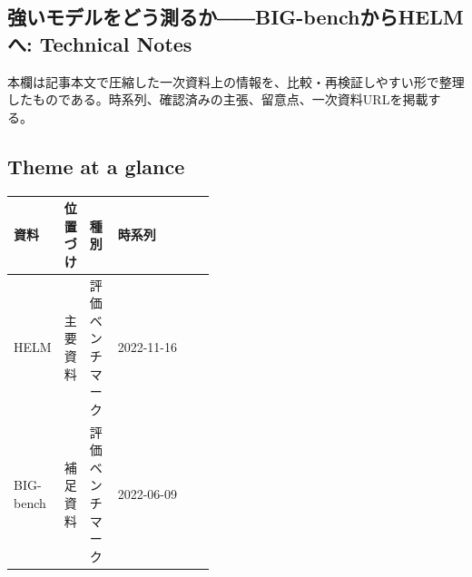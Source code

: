 \subsection*{強いモデルをどう測るか――BIG-benchからHELMへ: Technical Notes}
本欄は記事本文で圧縮した一次資料上の情報を、比較・再検証しやすい形で整理したものである。時系列、確認済みの主張、留意点、一次資料URLを掲載する。
\smallskip
{}\par
\medskip
\subsection*{Theme at a glance}
\begin{center}
\footnotesize
\begin{tabularx}{\linewidth}{@{}p{0.20\linewidth}p{0.10\linewidth}p{0.14\linewidth}X@{}}
\toprule
資料 & 位置づけ & 種別 & 時系列 \\
\midrule
HELM & 主要資料 & 評価ベンチマーク & 2022-11-16 \\
BIG-bench & 補足資料 & 評価ベンチマーク & 2022-06-09 \\
\bottomrule
\end{tabularx}
\end{center}
\normalsize

